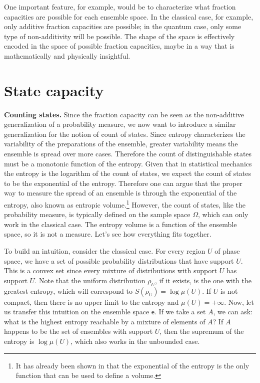 \documentclass[10pt,twocolumn, nofootinbib]{revtex4-2}
\newcommand{\ens}[1][e] {\mathsf{#1}} %
\begin{document}
One important feature, for example, would be to characterize what fraction capacities are possible for each ensemble space. In the classical case, for example, only additive fraction capacities are possible; in the quantum case, only some type of non-additivity will be possible. The shape of the space is effectively encoded in the space of possible fraction capacities, maybe in a way that is mathematically and physically insightful.

\section{State capacity}

\textbf{Counting states.} Since the fraction capacity can be seen as the non-additive generalization of a probability measure, we now want to introduce a similar generalization for the notion of count of states. Since entropy characterizes the variability of the preparations of the ensemble, greater variability means the ensemble is spread over more cases. Therefore the count of distinguishable states must be a monotonic function of the entropy. Given that in statistical mechanics the entropy is the logarithm of the count of states, we expect the count of states to be the exponential of the entropy. Therefore one can argue that the proper way to measure the spread of an ensemble is through the exponential of the entropy, also known as entropic volume.\footnote{It has already been shown in \cite{hall1999} that the exponential of the entropy is the only function that can be used to define a volume.} However, the count of states, like the probability measure, is typically defined on the sample space $\Omega$, which can only work in the classical case. The entropy volume is a function of the ensemble space, so it is not a measure. Let's see how everything fits together.

To build an intuition, consider the classical case. For every region $U$ of phase space, we have a set of possible probability distributions that have support $U$. This is a convex set since every mixture of distributions with support $U$ has support $U$. Note that the uniform distribution $\rho_U$, if it exists, is the one with the greatest entropy, which will correspond to $S(\rho_U) = \log \mu(U)$. If $U$ is not compact, then there is no upper limit to the entropy and $\mu(U) = +\infty$. Now, let us transfer this intuition on the ensemble space $\ens$. If we take a set $A$, we can ask: what is the highest entropy reachable by a mixture of elements of $A$? If $A$ happens to be the set of ensembles with support $U$, then the supremum of the entropy is $\log \mu(U)$, which also works in the unbounded case.
\end{document}
